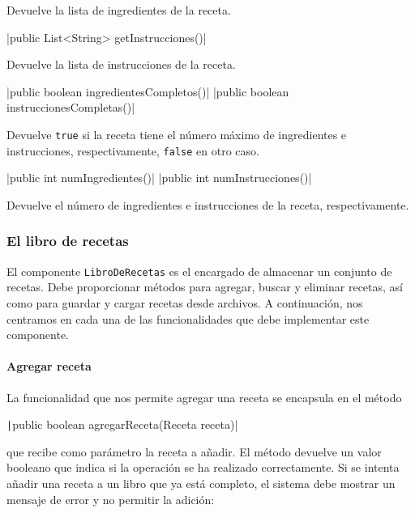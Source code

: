 \documentclass[
    a4paper, %
    12pt, %
]{CSSullivanBusinessReport}
\begin{document}
Devuelve la lista de ingredientes de la receta.

|public List<String> getInstrucciones()|

Devuelve la lista de instrucciones de la receta.

|public boolean ingredientesCompletos()|
|public boolean instruccionesCompletas()|

Devuelve \texttt{true} si la receta tiene el número máximo de ingredientes e instrucciones, respectivamente, \texttt{false} en otro caso.

|public int numIngredientes()|
|public int numInstrucciones()|

Devuelve el número de ingredientes e instrucciones de la receta, respectivamente.



\subsubsection{El libro de recetas}\label{sec:libro-recetas}

El componente \texttt{LibroDeRecetas} es el encargado de almacenar un conjunto de recetas. Debe proporcionar métodos para agregar, buscar y eliminar recetas, así como para guardar y cargar recetas desde archivos. A continuación, nos centramos en cada una de las funcionalidades que debe implementar este componente.

\paragraph{Agregar receta}

La funcionalidad que nos permite agregar una receta se encapsula en el método

\texttt|public boolean agregarReceta(Receta receta)|

que recibe como parámetro la receta a añadir. El método devuelve un valor booleano que indica si la operación se ha realizado correctamente. Si se intenta añadir una receta a un libro que ya está completo, el sistema debe mostrar un mensaje de error y no permitir la adición:
\end{document}

